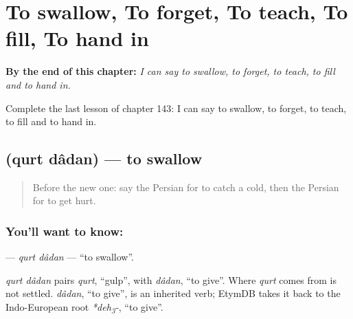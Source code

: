 
\chapter{To swallow, To forget, To teach, To fill, To hand in}
\label{ch:fa-to-swallow-to-forget-to-teach-to-fill-to-hand-in}

\begin{chapteropening}
\textbf{By the end of this chapter:} \emph{I can say to swallow, to forget, to teach, to fill and to hand in.}

Complete the last lesson of chapter 143: I can say to swallow, to forget, to teach, to fill and to hand in.
\end{chapteropening}

\section[\texorpdfstring{\fa{قورت} \fa{دادن} (qurt dâdan)}{قورت دادن (qurt dâdan)}]{  (qurt dâdan) — to swallow}

\label{lesson:FA-C143-qurt-dadan}



\begin{quote}
Before the new one: say the Persian for to catch a cold, then the Persian for to get hurt.
\end{quote}

\subsection*{You'll want to know:  }
\textbf{ } — \emph{qurt dâdan} — \textquotedblleft{}to swallow\textquotedblright{}.

\begin{cousinweb}
\emph{qurt dâdan} pairs \emph{qurt}, \textquotedblleft{}gulp\textquotedblright{}, with \emph{dâdan}, \textquotedblleft{}to give\textquotedblright{}. Where \emph{qurt} comes from is not settled. \emph{dâdan}, \textquotedblleft{}to give\textquotedblright{}, is an inherited verb; EtymDB takes it back to the Indo-European root \emph{*deh\textsubscript{3}-}, \textquotedblleft{}to give\textquotedblright{}.
\end{cousinweb}

